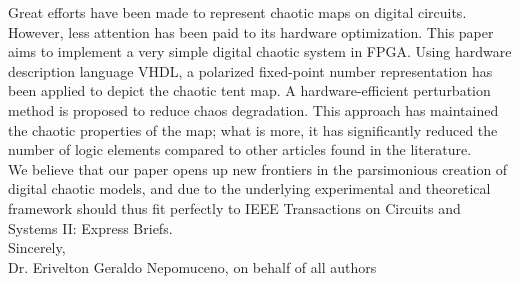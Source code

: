 \documentclass[12pt,arial]{article}
\begin{document}
Great efforts have been made to represent chaotic maps on digital circuits. However, less attention has been paid to its hardware optimization. This paper aims to implement a very simple digital chaotic system in FPGA. Using hardware description language VHDL, a polarized fixed-point number representation has been applied to depict the chaotic tent map. A hardware-efficient perturbation method is proposed to reduce chaos degradation. This approach has maintained the chaotic properties of the map; what is more, it has significantly reduced the number of logic elements compared to other articles found in the literature.   \\

We believe that our paper opens up new frontiers in the parsimonious creation of digital chaotic models, and due to the underlying experimental and theoretical framework should thus fit perfectly to IEEE Transactions on Circuits and Systems II: Express Briefs.\\

Sincerely,\\

Dr. Erivelton Geraldo Nepomuceno, on behalf of all authors
          
    \label{lastpage}
\end{document}
